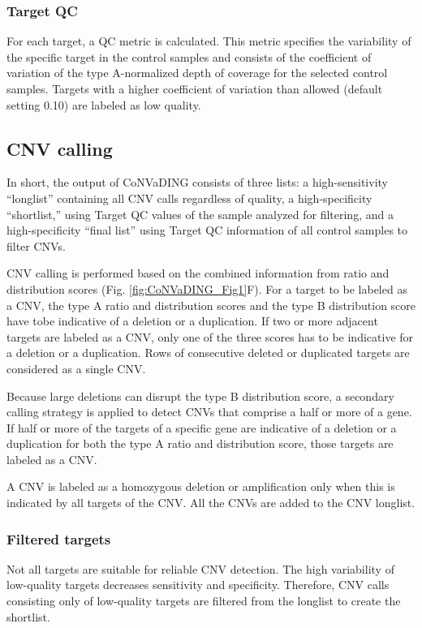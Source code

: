 \subsubsection{Target QC}
For each target, a QC metric is calculated. This metric specifies the variability of the specific target in the control samples and consists of the coefficient of variation of the type A-normalized depth of coverage for the selected control samples. 
Targets with a higher coefficient of variation than allowed (default setting 0.10) are labeled as low quality.

\subsection{CNV calling}
In short, the output of CoNVaDING consists of three lists: a high-sensitivity “longlist” containing all CNV calls regardless of quality, a high-specificity “shortlist,” using Target QC values of the sample analyzed for filtering, and a high-specificity “final list” using Target QC information of all control samples to filter CNVs. 

CNV calling is performed based on the combined information from ratio and distribution scores (Fig. \ref{fig:CoNVaDING_Fig1}F).
For a target to be labeled as a CNV, the type A ratio and distribution scores and the type B distribution score have tobe indicative of a deletion or a duplication. 
If two or more adjacent targets are labeled as a CNV, only one of the three scores has to be indicative for a deletion or a duplication. 
Rows of consecutive deleted or duplicated targets are considered as a single CNV. 

Because large deletions can disrupt the type B distribution score, a secondary calling strategy is applied to detect CNVs that comprise a half or more of a gene. 
If half or more of the targets of a specific gene are indicative of a deletion or a duplication for both the type A ratio and distribution score, those targets are labeled as a CNV. 

A CNV is labeled as a homozygous deletion or amplification only when this is indicated by all targets of the CNV. 
All the CNVs are added to the CNV longlist.

\subsubsection{Filtered targets}
Not all targets are suitable for reliable CNV detection. 
The high variability of low-quality targets decreases sensitivity and specificity. 
Therefore, CNV calls consisting only of low-quality targets are filtered from the longlist to create the shortlist. 

